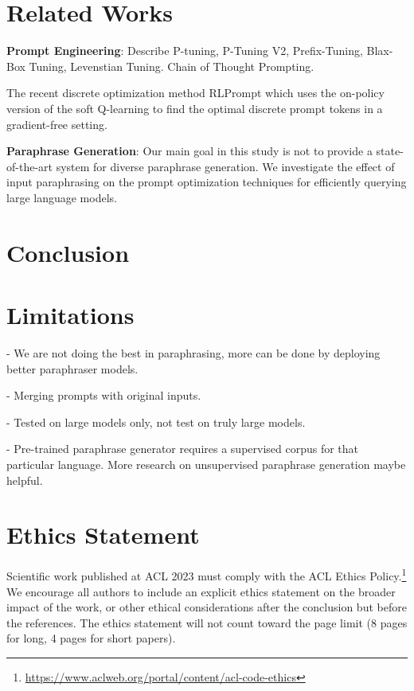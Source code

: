 \documentclass[11pt]{article}
\begin{document}
\section{Related Works}

\noindent
{\bf Prompt Engineering}:
Describe P-tuning, P-Tuning V2, Prefix-Tuning, Blax-Box Tuning, Levenstian Tuning. Chain of Thought Prompting.

The recent discrete optimization method RLPrompt \cite{deng-etal-2022-rlprompt} which uses the on-policy version of the soft Q-learning \cite{https://doi.org/10.48550/arxiv.2106.07704} to find the optimal discrete prompt tokens in a gradient-free setting.

\noindent
{\bf Paraphrase Generation}:
Our main goal in this study is not to provide a state-of-the-art system for diverse paraphrase generation. We investigate the effect of input paraphrasing on the prompt optimization techniques for efficiently querying large language models.

\section{Conclusion}

\section{Limitations}
- We are not doing the best in paraphrasing, more can be done by deploying better paraphraser models.

- Merging prompts with original inputs.

- Tested on large models only, not test on truly large models.

- Pre-trained paraphrase generator requires a supervised corpus for that particular language. More research on unsupervised paraphrase generation maybe helpful.

\section*{Ethics Statement}
Scientific work published at ACL 2023 must comply with the ACL Ethics Policy.\footnote{\url{https://www.aclweb.org/portal/content/acl-code-ethics}} We encourage all authors to include an explicit ethics statement on the broader impact of the work, or other ethical considerations after the conclusion but before the references. The ethics statement will not count toward the page limit (8 pages for long, 4 pages for short papers).
\end{document}
